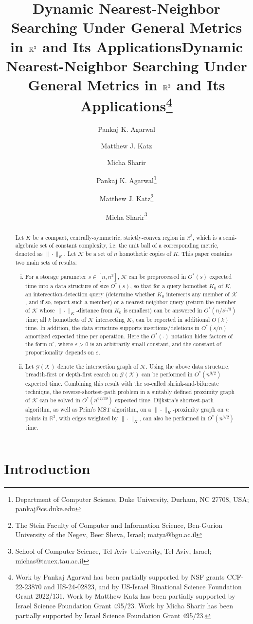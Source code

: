 \documentclass[11pt]{article}
\author{Pankaj K. Agarwal}
    		{Department of Computer Science, Duke University, Durham, NC 27708, USA}
    		{pankaj@cs.duke.edu}
    			{https://orcid.org/0000-0002-9439-181X}
    		{Partially supported by NSF grants CCF-20-07556, and CCF-22-23870.}
\author{Matthew J. Katz}
    		{The Stein Faculty of Computer and Information Science, Ben-Gurion University of the Negev, Beer Sheva, Israel}
    		{matya@bgu.ac.il}
    		{https://orcid.org/0000-0002-0672-729X}
    		{Partially supported by Israel Science Foundation Grant 495/23.}
\author{Micha Sharir}
    		{School of Computer Science, Tel Aviv University, Tel Aviv, Israel}
    		{michas@tauex.tau.ac.il}
    		{https://orcid.org/0000-0002-2541-3763}
    		{Partially supported by Israel Science Foundation Grant 495/23.}
\title{Dynamic Nearest-Neighbor Searching Under General Metrics in $\reals^3$ and Its Applications}
\title{Dynamic Nearest-Neighbor Searching Under General Metrics in $\reals^3$ and Its Applications\thanks{%
  Work by Pankaj Agarwal has been partially supported by NSF grants
  CCF-22-23870  and IIS-24-02823, and by US-Israel Binational Science
  Foundation Grant 2022/131. 
  Work by Matthew Katz has been partially supported by Israel Science Foundation Grant 495/23.
  Work by Micha Sharir has been partially supported by Israel Science Foundation Grant 495/23.
  }
  }
\author{
    Pankaj K. Agarwal\thanks{
    Department of Computer Science, Duke University, Durham, NC 27708, USA;
    {\sf pankaj@cs.duke.edu}}
\and
    Matthew J. Katz\thanks{
    The Stein Faculty of Computer and Information Science, Ben-Gurion University of the Negev, Beer Sheva, Israel;
    {\sf matya@bgu.ac.il}}
\and
    Micha Sharir\thanks{
    School of Computer Science, Tel Aviv University, Tel Aviv, Israel;
    {\sf michas@tauex.tau.ac.il}}
}
\def\reals{{\mathbb R}}
\def\eps{{\varepsilon}}
\def\G{\mathcal{G}}
\def\K{\mathcal{K}}
\theoremstyle{definition}
\begin{document}
\ifsocgproc
\nolinenumbers
\fi
\maketitle

\begin{abstract}
	Let $K$ be a compact, centrally-symmetric, strictly-convex region in $\reals^3$, which is 
a semi-algebraic set of constant complexity, i.e. the unit ball of a corresponding metric,
denoted as $\|\cdot\|_K$. Let $\K$ be a set of $n$ homothetic copies of $K$.
This paper contains two main sets of results:
	\begin{enumerate}[(i)] 
	\item   For a storage parameter $s\in[n,n^3]$, $\K$ can be preprocessed in 
		$O^*(s)$ expected time into a data structure of size $O^*(s)$, so 
		that for a query homothet $K_0$ of $K$,
		an intersection-detection query (determine whether $K_0$ intersects any member of $\K$, 
		and if so, report such a member) or a nearest-neighbor query (return
                the member of $\K$ whose $\|\cdot\|_K$-distance from $K_0$ is smallest) can be 
		answered in $O^*(n/s^{1/3})$ time; all $k$ homothets of $\K$ intersecting $K_0$ can be 
		reported in additional $O(k)$ time. In addition, the data structure supports
		insertions/deletions in $O^*(s/n)$ amortized expected time per operation. Here the 
		$O^*(\cdot)$ notation hides factors of the form $n^\eps$, where $\eps>0$ 
		is an arbitrarily small constant, and the constant of proportionality depends on $\eps$.
	\item Let $\G(\K)$ denote the intersection graph of $\K$.  Using the above data 
		structure, breadth-first or depth-first search  on $\G(\K)$ can be 
		performed in  $O^*(n^{3/2})$ expected time.  Combining this result with the so-called 
		shrink-and-bifurcate technique,
                the reverse-shortest-path problem in a suitably defined proximity graph of $\K$ can 
		be solved in $O^*(n^{62/39})$ expected time.
		Dijkstra's shortest-path algorithm, as well as Prim's MST algorithm, on a 
	        $\|\cdot\|_K$-proximity graph on $n$ points in $\reals^3$, 
		with edges weighted by $\|\cdot\|_K$, can also be performed in $O^*(n^{3/2})$ time.
	\end{enumerate}
\end{abstract}


\section{Introduction}
\label{sec:intro}
\end{document}
